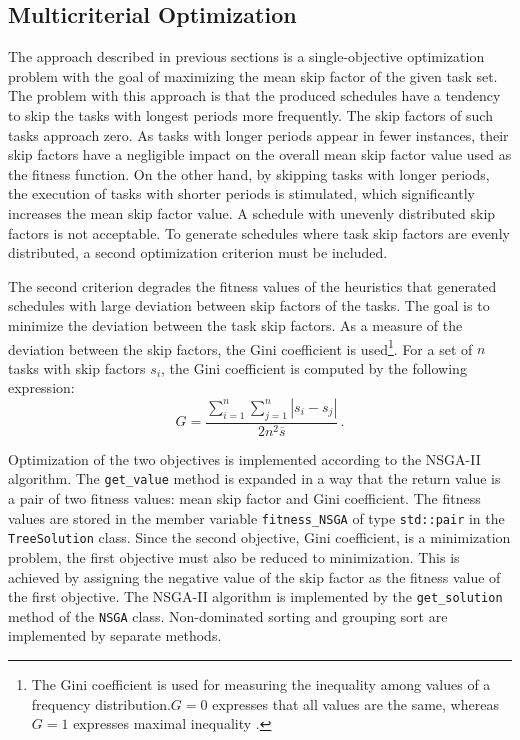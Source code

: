 \subsection{Multicriterial Optimization}
The approach described in previous sections is a single-objective optimization problem with the goal of maximizing the mean skip factor of the given task set.
The problem with this approach is that the produced schedules have a tendency to skip the tasks with longest periods more frequently.
The skip factors of such tasks approach zero.
As tasks with longer periods appear in fewer instances, their skip factors have a negligible impact on the overall mean skip factor value used as the fitness function.
On the other hand, by skipping tasks with longer periods, the execution of tasks with shorter periods is stimulated, which significantly increases the mean skip factor value.
A schedule with unevenly distributed skip factors is not acceptable.
To generate schedules where task skip factors are evenly distributed, a second optimization criterion must be included.

The second criterion degrades the fitness values of the heuristics that generated schedules with large deviation between skip factors of the tasks.
The goal is to minimize the deviation between the task skip factors.
As a measure of the deviation between the skip factors, the Gini coefficient is used\footnote{The Gini coefficient is used for measuring the inequality among values of a frequency distribution.$G=0$ expresses that all values are the same, whereas $G=1$ expresses maximal inequality \cite{gini1912variabilita}.}.
For a set of $n$ tasks with skip factors $s_i$, the Gini coefficient is computed by the following expression:
\begin{equation*}
G = \frac{\sum_{i=1}^{n}\sum_{j=1}^{n}|s_i - s_j|}{2n^2\overline{s}} \, .
\end{equation*}

Optimization of the two objectives is implemented according to the NSGA-II algorithm.
The \texttt{get\_value} method is expanded in a way that the return value is a pair of two fitness values: mean skip factor and Gini coefficient.
The fitness values are stored in the member variable \texttt{fitness\_NSGA} of type \texttt{std::pair} in the \texttt{TreeSolution} class.
Since the second objective, Gini coefficient, is a minimization problem, the first objective must also be reduced to minimization.
This is achieved by assigning the negative value of the skip factor as the fitness value of the first objective.
The NSGA-II algorithm is implemented by the \texttt{get\_solution} method of the \texttt{NSGA} class.
Non-dominated sorting and grouping sort are implemented by separate methods.

